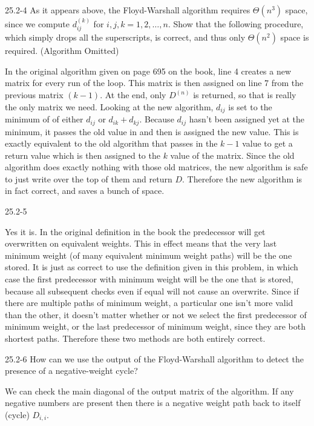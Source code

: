 \begin{problem}{25.2-4}
  As it appears above, the Floyd-Warshall algorithm requires $\Theta(n^3)$ space, since we compute $d_{ij}^{(k)}$ for
  $i, j, k = 1, 2, \ldots, n$. Show that the following procedure, which simply drops all the superscripts, is correct,
  and thus only $\Theta(n^2)$ space is required.
  \br
  (Algorithm Omitted)
  \begin{solution}
    In the original algorithm given on page 695 on the book, line 4 creates a new matrix for every run of the loop.
    This matrix is then assigned on line 7 from the previous matrix $(k - 1)$.
    \br
    At the end, only $D^{(n)}$ is returned, so that is really the only matrix we need.
    \br
    Looking at the new algorithm, $d_{ij}$ is set to the minimum of of either $d_{ij}$ or $d_{ik} + d_{kj}$. Because 
    $d_{ij}$ hasn't been assigned yet at the minimum, it passes the old value in and then is assigned the new value.
    This is exactly equivalent to the old algorithm that passes in the $k - 1$ value to get a return value which is then
    assigned to the $k$ value of the matrix.
    \br
    Since the old algorithm does exactly nothing with those old matrices, the new algorithm is safe to just write over
    the top of them and return $D$.
    \br
    Therefore the new algorithm is in fact correct, and saves a bunch of space.
  \end{solution}
\end{problem}

\begin{problem}{25.2-5}
  \begin{solution}
    Yes it is. In the original definition in the book the predecessor will get overwritten on equivalent weights.
    This in effect means that the very last minimum weight (of many equivalent minimum weight paths) will be the one stored.
    It is just as correct to use the definition given in this problem, in which case the first predecessor with minimum
    weight will be the one that is stored, because all subsequent checks even if equal will not cause an overwrite.
    \br
    Since if there are multiple paths of minimum weight, a particular one isn't more valid than the other, it doesn't
    matter whether or not we select the first predecessor of minimum weight, or the last predecessor of minimum weight,
    since they are both shortest paths.
    \br
    Therefore these two methods are both entirely correct.
  \end{solution}
\end{problem}

\begin{problem}{25.2-6}
  How can we use the output of the Floyd-Warshall algorithm to detect the presence of a negative-weight cycle?
  \begin{solution}
    We can check the main diagonal of the output matrix of the algorithm.  If any negative numbers are present then
    there is a negative weight path back to itself (cycle) $D_{i,i}$.
  \end{solution}
\end{problem}


